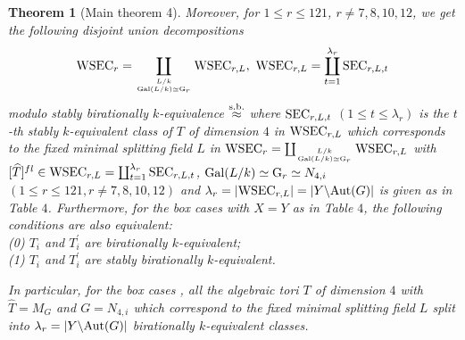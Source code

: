 \documentclass{amsart}
\theoremstyle{plain}
\newtheorem{theorem}{Theorem}[section]
\theoremstyle{definition}
\theoremstyle{remark}
\begin{document}
\begin{theorem}[Main theorem 4]
Moreover, for $1\leq r\leq 121$, $r\neq 7,8,10,12$, 
we get the following disjoint union decompositions 
\begin{align*}
{\rm WSEC}_r=\coprod_{L/k\atop {\rm Gal}(L/k)\simeq {\rm G}_r}
{\rm WSEC}_{r,L},\ 
{\rm WSEC}_{r,L}=
\coprod_{t=1}^{\lambda_{r}} {\rm SEC}_{r,L,t}
\end{align*}
modulo stably birationally $k$-equivalence $\stackrel{\rm s.b.}{\approx}$ 
where 
${\rm SEC}_{r,L,t}$ $(1\leq t\leq \lambda_{r})$ is the $t$-th 
stably $k$-equivalent class of $T$ of dimension $4$ in 
${\rm WSEC}_{r,L}$ which corresponds to the fixed minimal splitting field $L$ 
in 
${\rm WSEC}_r=\coprod_{L/k\atop {\rm Gal}(L/k)\simeq {\rm G}_r} {\rm WSEC}_{r,L}$ 
with 
$[\widehat{T}]^{fl}\in {\rm WSEC}_{r,L}
=\coprod_{t=1}^{\lambda_r} {\rm SEC}_{r,L,t}$, 
${\rm Gal}(L/k)\simeq {\rm G}_r\simeq N_{4,i}$ 
$(1\leq r\leq 121, r\neq 7,8,10,12)$ and 
$\lambda_r=|{\rm WSEC}_{r,L}|=|Y\backslash {\rm Aut}(G)|$ 
is given as in Table $4$. 
%
Furthermore, 
for the box cases  with $X=Y$ as in Table $4$,
the following conditions are also equivalent:\\
{\rm (0)} $T_i$ and $T_i^\prime$ are birationally $k$-equivalent;\\
{\rm (1)} $T_i$ and $T_i^\prime$ are stably birationally $k$-equivalent. 

In particular, for the box cases , 
all the algebraic tori $T$ of dimension $4$ 
with $\widehat{T}=M_G$ and $G=N_{4,i}$ 
which correspond to the fixed minimal splitting field $L$ 
split into 
$\lambda_r=|Y\backslash {\rm Aut}(G)|$ birationally $k$-equivalent classes. 
\end{theorem}
%
\end{document}

